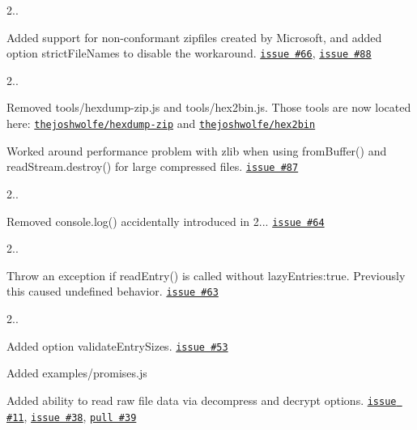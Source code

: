 \begin{DoxyItemize}
\item 2..
\begin{DoxyItemize}
\item Added support for non-\/conformant zipfiles created by Microsoft, and added option {\ttfamily strict\+File\+Names} to disable the workaround. \href{https://github.com/thejoshwolfe/yauzl/issues/66}{\tt issue \#66}, \href{https://github.com/thejoshwolfe/yauzl/issues/88}{\tt issue \#88}
\end{DoxyItemize}
\item 2..
\begin{DoxyItemize}
\item Removed {\ttfamily tools/hexdump-\/zip.\+js} and {\ttfamily tools/hex2bin.\+js}. Those tools are now located here\+: \href{https://github.com/thejoshwolfe/hexdump-zip}{\tt thejoshwolfe/hexdump-\/zip} and \href{https://github.com/thejoshwolfe/hex2bin}{\tt thejoshwolfe/hex2bin}
\item Worked around performance problem with zlib when using {\ttfamily from\+Buffer()} and {\ttfamily read\+Stream.\+destroy()} for large compressed files. \href{https://github.com/thejoshwolfe/yauzl/issues/87}{\tt issue \#87}
\end{DoxyItemize}
\item 2..
\begin{DoxyItemize}
\item Removed {\ttfamily console.\+log()} accidentally introduced in 2... \href{https://github.com/thejoshwolfe/yauzl/issues/64}{\tt issue \#64}
\end{DoxyItemize}
\item 2..
\begin{DoxyItemize}
\item Throw an exception if {\ttfamily read\+Entry()} is called without {\ttfamily lazy\+Entries\+:true}. Previously this caused undefined behavior. \href{https://github.com/thejoshwolfe/yauzl/issues/63}{\tt issue \#63}
\end{DoxyItemize}
\item 2..
\begin{DoxyItemize}
\item Added option {\ttfamily validate\+Entry\+Sizes}. \href{https://github.com/thejoshwolfe/yauzl/issues/53}{\tt issue \#53}
\item Added {\ttfamily examples/promises.\+js}
\item Added ability to read raw file data via {\ttfamily decompress} and {\ttfamily decrypt} options. \href{https://github.com/thejoshwolfe/yauzl/issues/11}{\tt issue \#11}, \href{https://github.com/thejoshwolfe/yauzl/issues/38}{\tt issue \#38}, \href{https://github.com/thejoshwolfe/yauzl/pull/39}{\tt pull \#39}

\end{DoxyItemize}
\end{DoxyItemize}
